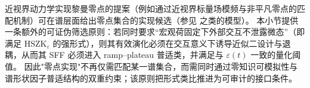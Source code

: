 \begin{remark}\label{rem:discussion-zk-filter-zero-realization}
近视界动力学实现黎曼零点的提案（例如通过近视界标量场模频与非平凡零点的匹配机制）可在谱层面给出零点集合的实现候选（参见 \cite{Giri2010PhysicalRealizationRiemannZerosBlackHole} 之类的模型）。
本小节提供一条额外的可证伪筛选原则：若同时要求“宏观荷固定下外部交互不泄露微态”（即满足 \(\mathrm{HSZK}_\varepsilon\) 的强形式），则其有效演化必须在交互意义下诱导近似二设计与退耦，从而其 SFF 必须进入 ramp--plateau 普适类，并满足与 \(\varepsilon(t)\) 一致的量化阈值。
因此"零点实现"不再仅需匹配某一谱集合，而需同时通过零知识可模拟性与谱形状因子普适结构的双重约束；该原则把形式类比推进为可审计的接口条件。
\end{remark}

\endinput
